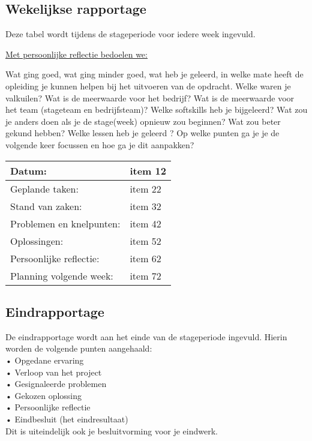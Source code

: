 \documentclass[a4paper]{article}
\begin{document}
    \subsection{Wekelijkse rapportage}
      Deze tabel wordt tijdens de stageperiode voor iedere week ingevuld.\par
      \underline{Met persoonlijke reflectie bedoelen we:}\par
      Wat ging goed, wat ging minder goed, wat heb je geleerd, in welke mate heeft de
      opleiding je kunnen helpen bij het uitvoeren van de opdracht. Welke waren je
      valkuilen? Wat is de meerwaarde voor het bedrijf? Wat is de meerwaarde voor het
      team (stageteam en bedrijfsteam)? Welke softskills heb je bijgeleerd? Wat zou je
      anders doen als je de stage(week) opnieuw zou beginnen? Wat zou beter gekund hebben?
      Welke lessen heb je geleerd ? Op welke punten ga je je de volgende keer focussen
      en hoe ga je dit aanpakken?

      \begin{tabularx}{\textwidth}{| l | X |}
        \hline
        Datum: & item 12 \\
        \hline
        Geplande taken: & item 22 \\
        \hline 
        Stand van zaken: & item 32 \\
        \hline
        Problemen en knelpunten: & item 42 \\
        \hline
        Oplossingen: & item 52 \\
        \hline
        Persoonlijke reflectie: & item 62 \\
        \hline
        Planning volgende week: & item 72 \\
        \hline
      \end{tabularx}

    \subsection{Eindrapportage}
      De eindrapportage wordt aan het einde van de stageperiode ingevuld. Hierin worden de
      volgende punten aangehaald:\\
        • Opgedane ervaring\\
        • Verloop van het project\\
        • Gesignaleerde problemen\\
        • Gekozen oplossing\\
        • Persoonlijke reflectie\\
        • Eindbesluit (het eindresultaat)\\
      Dit is uiteindelijk ook je besluitvorming voor je eindwerk.
\end{document}
